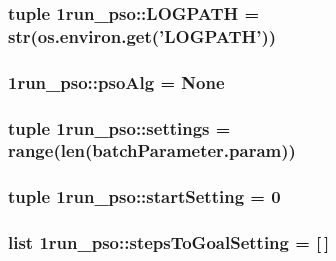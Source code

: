 \hypertarget{namespace1run__pso_b8fdfee817fe1970a4a8548265edd97b}{
\subsubsection{\setlength{\rightskip}{0pt plus 5cm}tuple 1run\_\-pso::LOGPATH = str(os.environ.get('{\bf LOGPATH}'))}}
\label{namespace1run__pso_b8fdfee817fe1970a4a8548265edd97b}


\hypertarget{namespace1run__pso_fde51d1399f109eb6961b09b2b48203f}{
\subsubsection{\setlength{\rightskip}{0pt plus 5cm}1run\_\-pso::psoAlg = None}}
\label{namespace1run__pso_fde51d1399f109eb6961b09b2b48203f}


\hypertarget{namespace1run__pso_f3a5da1c01a1c9220a5d339ba0c12a56}{
\subsubsection{\setlength{\rightskip}{0pt plus 5cm}tuple 1run\_\-pso::settings = range(len(batchParameter.param))}}
\label{namespace1run__pso_f3a5da1c01a1c9220a5d339ba0c12a56}


\hypertarget{namespace1run__pso_534b665c5bbb9b1220f0dc9b7dcb594a}{
\subsubsection{\setlength{\rightskip}{0pt plus 5cm}tuple 1run\_\-pso::startSetting = 0}}
\label{namespace1run__pso_534b665c5bbb9b1220f0dc9b7dcb594a}


\hypertarget{namespace1run__pso_f32304253baa1276fdb0ca14d8ab0ac5}{
\subsubsection{\setlength{\rightskip}{0pt plus 5cm}list 1run\_\-pso::stepsToGoalSetting = \mbox{[}$\,$\mbox{]}}}
\label{namespace1run__pso_f32304253baa1276fdb0ca14d8ab0ac5}


